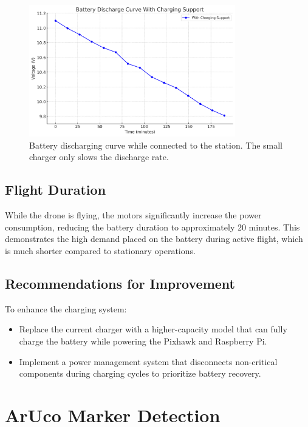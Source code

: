 \begin{figure}[H]
    \centering
    \includegraphics[width=0.8\textwidth]{pictures/Battery_Discharge_Inside.png}
    \caption{Battery discharging curve while connected to the station. The small charger only slows the discharge rate.}
    \label{fig:battery_discharge_curve}
\end{figure}

\subsection{Flight Duration}

While the drone is flying, the motors significantly increase the power consumption, reducing the battery duration to approximately 20 minutes. This demonstrates the high demand placed on the battery during active flight, which is much shorter compared to stationary operations.

\subsection{Recommendations for Improvement}

To enhance the charging system:
\begin{itemize}
    \item Replace the current charger with a higher-capacity model that can fully charge the battery while powering the Pixhawk and Raspberry Pi.
    \item Implement a power management system that disconnects non-critical components during charging cycles to prioritize battery recovery.
\end{itemize}


\section{ArUco Marker Detection}

